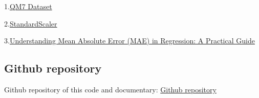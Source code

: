 \documentclass{article}
\begin{document}
1.\href{http://quantum-machine.org/datasets/}{QM7 Dataset}

2.\href{https://scikit-learn.org/stable/modules/generated/sklearn.preprocessing.StandardScaler.html}{StandardScaler}

3.\href{https://medium.com/@m.waqar.ahmed/understanding-mean-absolute-error-mae-in-regression-a-practical-guide-26e80ebb97df}{Understanding
Mean Absolute Error (MAE) in Regression: A Practical Guide}

\subsection{Github repository}\label{github-repository}

Github repository of this code and documentary:
\href{https://github.com/HoangTrang150302/AI_test}{Github repository}
\end{document}
